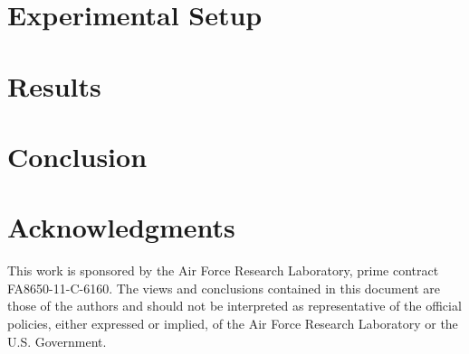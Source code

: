 \documentclass[]{article}
\begin{document}
\section{Experimental Setup}
\label{sec:Experimental Setup}


\section{Results}
\label{sec:Results}



\section{Conclusion}



 \section*{Acknowledgments}
This work is sponsored by the Air Force Research Laboratory, prime contract FA8650-11-C-6160.  The views and conclusions contained in this document are those of the authors and should not be interpreted as representative of the official policies, either expressed or implied, of the Air Force Research Laboratory or the U.S. Government.



\end{document}
